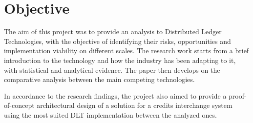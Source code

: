 
\newpage

\mbox{}\vfill
\chapter*{\centering Objective}

The aim of this project was to provide an analysis to Distributed Ledger Technologies, with the objective of identifying their risks, opportunities and implementation viability on different scales. The research work starts from a brief introduction to the technology and how the industry has been adapting to it, with statistical and analytical evidence. The paper then develops on the comparative analysis between the main competing technologies.

In accordance to the research findings, the project also aimed to provide a proof-of-concept architectural design of a solution for a credits interchange system using the most suited DLT implementation between the analyzed ones.

\mbox{}\vfill